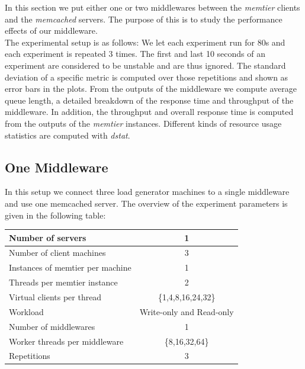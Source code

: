 
In this section we put either one or two middlewares between the \textit{memtier} clients and the \textit{memcached} servers. The purpose of this is to study the performance effects of our middleware. \\
The experimental setup is as follows: We let each experiment run for 80s and each experiment is repeated 3 times. The first and last 10 seconds of an experiment are considered to be unstable and are thus ignored. The standard deviation of a specific metric is computed over those repetitions and shown as error bars in the plots. From the outputs of the middleware we compute average queue length, a detailed breakdown of the response time and throughput of the middleware. In addition, the throughput and overall response time is computed from the outputs of the \textit{memtier} instances. Different kinds of resource usage statistics are computed with \textit{dstat}.

\subsection{One Middleware} \label{sec:baselineWithMWOne}
In this setup we connect three load generator machines to a single middleware and use one memcached server. The overview of the experiment parameters is given in the following table:
\begin{center}
	\scriptsize{
		\begin{tabular}{|l|c|}
			\hline Number of servers                & 1                        \\ 
			\hline Number of client machines        & 3                        \\ 
			\hline Instances of memtier per machine & 1                        \\ 
			\hline Threads per memtier instance     & 2                        \\
			\hline Virtual clients per thread       & \{1,4,8,16,24,32\}  \\ 
			\hline Workload                         & Write-only and Read-only \\
			\hline Number of middlewares            & 1                        \\
			\hline Worker threads per middleware    & \{8,16,32,64\}             \\
			\hline Repetitions                      & 3                         \\ 
			\hline 
		\end{tabular}
	} 
\end{center}

